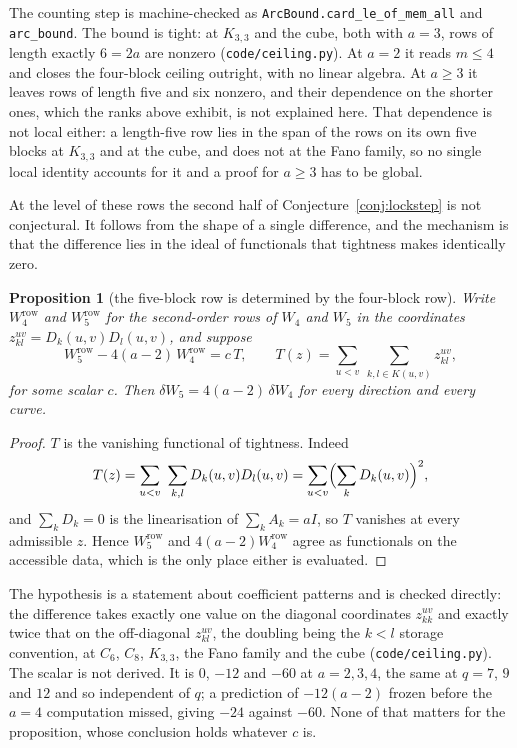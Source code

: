 \documentclass[11pt]{article}
\newtheorem{proposition}[theorem]{Proposition}
\theoremstyle{remark}
\begin{document}
The counting step is machine-checked as \texttt{ArcBound.card\_le\_of\_mem\_all} and
\texttt{arc\_bound}. The bound is tight: at $K_{3,3}$ and the cube, both with $a=3$, rows of length
exactly $6=2a$ are nonzero (\texttt{code/ceiling.py}). At $a=2$ it reads $m\le4$ and closes the
four-block ceiling outright, with no linear algebra. At $a\ge3$ it leaves rows of length five and six
nonzero, and their dependence on the shorter ones, which the ranks above exhibit, is not explained
here. That dependence is not local either: a length-five row lies in the span of the rows on its own
five blocks at $K_{3,3}$ and at the cube, and does not at the Fano family, so no single local identity
accounts for it and a proof for $a\ge3$ has to be global.

At the level of these rows the second half of Conjecture~\ref{conj:lockstep} is not conjectural. It
follows from the shape of a single difference, and the mechanism is that the difference lies in the
ideal of functionals that tightness makes identically zero.

\begin{proposition}[the five-block row is determined by the four-block row]\label{prop:I2}
Write $W_4^{\mathrm{row}}$ and $W_5^{\mathrm{row}}$ for the second-order rows of $W_4$ and $W_5$ in
the coordinates $z^{uv}_{kl}=D_k(u,v)D_l(u,v)$, and suppose
\[
W_5^{\mathrm{row}}-4(a-2)\,W_4^{\mathrm{row}}=c\,T,\qquad
T(z)=\sum_{u<v}\ \sum_{k,l\in K(u,v)}z^{uv}_{kl},
\]
for some scalar $c$. Then $\delta W_5=4(a-2)\,\delta W_4$ for every direction and every curve.
\end{proposition}

\begin{proof}
$T$ is the vanishing functional of tightness. Indeed
\[
T(z)=\sum_{u<v}\ \sum_{k,l}D_k(u,v)D_l(u,v)=\sum_{u<v}\Bigl(\sum_kD_k(u,v)\Bigr)^2,
\]
and $\sum_kD_k=0$ is the linearisation of $\sum_kA_k=aI$, so $T$ vanishes at every admissible $z$.
Hence $W_5^{\mathrm{row}}$ and $4(a-2)W_4^{\mathrm{row}}$ agree as functionals on the accessible data,
which is the only place either is evaluated.
\end{proof}

The hypothesis is a statement about coefficient patterns and is checked directly: the difference takes
exactly one value on the diagonal coordinates $z^{uv}_{kk}$ and exactly twice that on the off-diagonal
$z^{uv}_{kl}$, the doubling being the $k<l$ storage convention, at $C_6$, $C_8$, $K_{3,3}$, the Fano
family and the cube (\texttt{code/ceiling.py}). The scalar is not derived. It is $0$, $-12$ and $-60$
at $a=2,3,4$, the same at $q=7$, $9$ and $12$ and so independent of $q$; a prediction of $-12(a-2)$
frozen before the $a=4$ computation missed, giving $-24$ against $-60$. None of that matters for the
proposition, whose conclusion holds whatever $c$ is.
\end{document}
